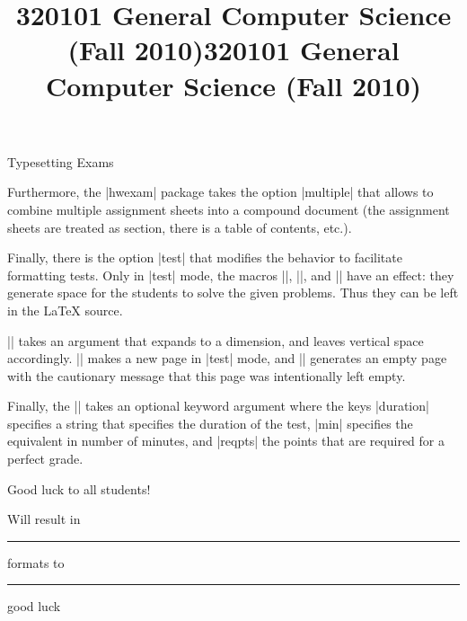 \begin{sfragment}{Typesetting Exams}

Furthermore, the |hwexam| package takes the option
|multiple| that allows to combine multiple assignment sheets into
a compound document (the assignment sheets are treated as section, there is a table of
contents, etc.). 

Finally, there is the option |test| that modifies the behavior to
facilitate formatting tests. Only in |test| mode, the macros |\testspace|,
|\testnewpage|, and |\testemptypage| have an effect: they generate space for the
students to solve the given problems. Thus they can be left in the {\LaTeX} source. 

\DescribeMacro{\testspace}|\testspace| takes an argument that expands to a dimension,
and leaves vertical space accordingly. \DescribeMacro{\testnewpage}|\testnewpage| makes
a new page in |test| mode, and \DescribeMacro{\testemptypage}|\testemptypage| generates
an empty page with the cautionary message that this page was intentionally left empty.

Finally, the |\testheading| takes an optional keyword argument
where the keys |duration| specifies a string that specifies the
duration of the test, |min| specifies the equivalent in number of
minutes, and |reqpts| the points that are required for a perfect
grade.

\begin{latexcode}
\title{320101 General Computer Science (Fall 2010)}
\begin{testheading}[duration=one hour,min=60,reqpts=27]
  Good luck to all students!
\end{testheading}
\end{latexcode}

Will result in
\begin{center}
  \begin{minipage}{.9\textwidth}
\makeatletter
{}
\makeatother
\vspace*{-3ex}\hrule\vspace*{.5ex}  formats to\vspace*{1ex}
\hrule\par\noindent\vspace*{2ex}
\title{320101 General Computer Science (Fall 2010)}
\begin{testheading}[duration=one hour,min=60,reqpts=27]
  good luck
\end{testheading}
\end{minipage}
\end{center}
\end{sfragment}

